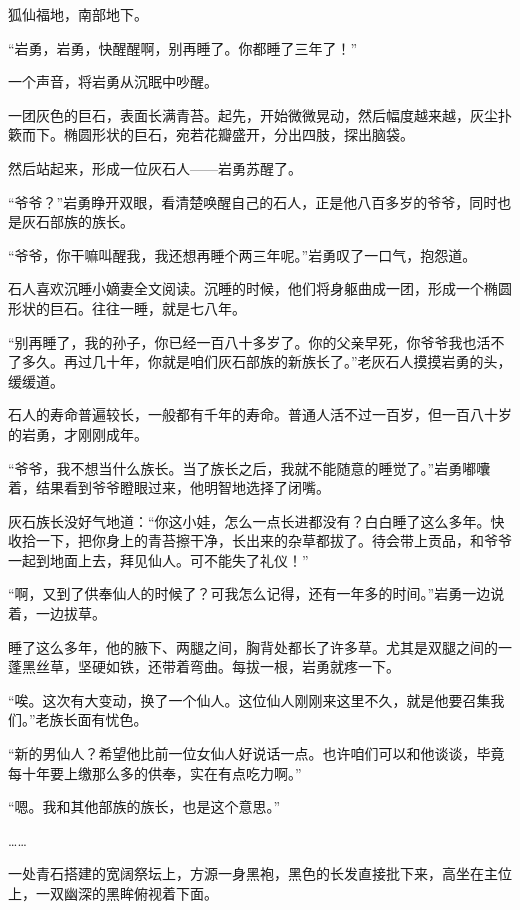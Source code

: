 
\begin{this_body}

狐仙福地，南部地下。

“岩勇，岩勇，快醒醒啊，别再睡了。你都睡了三年了！”

一个声音，将岩勇从沉眠中吵醒。

一团灰色的巨石，表面长满青苔。起先，开始微微晃动，然后幅度越来越，灰尘扑簌而下。椭圆形状的巨石，宛若花瓣盛开，分出四肢，探出脑袋。

然后站起来，形成一位灰石人——岩勇苏醒了。

“爷爷？”岩勇睁开双眼，看清楚唤醒自己的石人，正是他八百多岁的爷爷，同时也是灰石部族的族长。

“爷爷，你干嘛叫醒我，我还想再睡个两三年呢。”岩勇叹了一口气，抱怨道。

石人喜欢沉睡小嫡妻全文阅读。沉睡的时候，他们将身躯曲成一团，形成一个椭圆形状的巨石。往往一睡，就是七八年。

“别再睡了，我的孙子，你已经一百八十多岁了。你的父亲早死，你爷爷我也活不了多久。再过几十年，你就是咱们灰石部族的新族长了。”老灰石人摸摸岩勇的头，缓缓道。

石人的寿命普遍较长，一般都有千年的寿命。普通人活不过一百岁，但一百八十岁的岩勇，才刚刚成年。

“爷爷，我不想当什么族长。当了族长之后，我就不能随意的睡觉了。”岩勇嘟囔着，结果看到爷爷瞪眼过来，他明智地选择了闭嘴。

灰石族长没好气地道：“你这小娃，怎么一点长进都没有？白白睡了这么多年。快收拾一下，把你身上的青苔擦干净，长出来的杂草都拔了。待会带上贡品，和爷爷一起到地面上去，拜见仙人。可不能失了礼仪！”

“啊，又到了供奉仙人的时候了？可我怎么记得，还有一年多的时间。”岩勇一边说着，一边拔草。

睡了这么多年，他的腋下、两腿之间，胸背处都长了许多草。尤其是双腿之间的一蓬黑丝草，坚硬如铁，还带着弯曲。每拔一根，岩勇就疼一下。

“唉。这次有大变动，换了一个仙人。这位仙人刚刚来这里不久，就是他要召集我们。”老族长面有忧色。

“新的男仙人？希望他比前一位女仙人好说话一点。也许咱们可以和他谈谈，毕竟每十年要上缴那么多的供奉，实在有点吃力啊。”

“嗯。我和其他部族的族长，也是这个意思。”

……

一处青石搭建的宽阔祭坛上，方源一身黑袍，黑色的长发直接批下来，高坐在主位上，一双幽深的黑眸俯视着下面。


\end{this_body}
